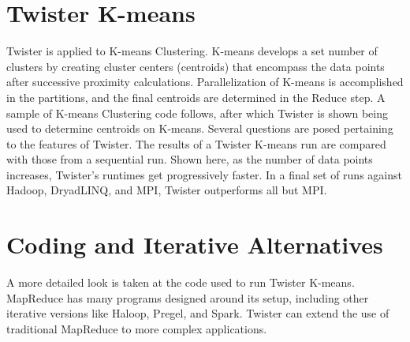 \section{Twister K-means}

Twister is applied to K-means Clustering. K-means develops a set number
of clusters by creating cluster centers (centroids) that encompass the
data points after successive proximity calculations. Parallelization of
K-means is accomplished in the partitions, and the final centroids are
determined in the Reduce step. A sample of K-means Clustering code
follows, after which Twister is shown being used to determine centroids
on K-means. Several questions are posed pertaining to the features of
Twister. The results of a Twister K-means run are compared with those
from a sequential run. Shown here, as the number of data points
increases, Twister's runtimes get progressively faster. In a final set
of runs against Hadoop, DryadLINQ, and MPI, Twister outperforms all but
MPI.



\section{Coding and Iterative Alternatives}

A more detailed look is taken at the code used to run Twister K-means.
MapReduce has many programs designed around its setup, including other
iterative versions like Haloop, Pregel, and Spark. Twister can extend
the use of traditional MapReduce to more complex applications.


